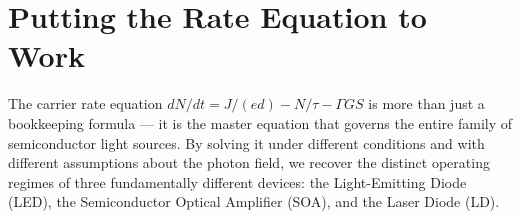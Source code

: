 
\section{Putting the Rate Equation to Work}

The carrier rate equation $dN/dt = J/(ed) - N/\tau - \Gamma G S$ is more than just a bookkeeping formula — it is the master equation that governs the entire family of semiconductor light sources. By solving it under different conditions and with different assumptions about the photon field, we recover the distinct operating regimes of three fundamentally different devices: the Light-Emitting Diode (LED), the Semiconductor Optical Amplifier (SOA), and the Laser Diode (LD).

